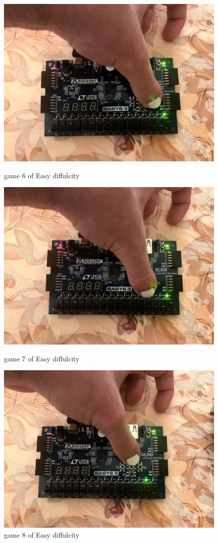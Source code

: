 \documentclass[11pt]{article}
\begin{document}
\begin{figure}[ht]
	\includegraphics{IMG_1316.JPG}
	\caption{game 6 of Easy diffulcity }
	\label{fig:sim_with_table}
	
	\includegraphics{IMG_1317.JPG}
	\caption{game 7 of Easy diffulcity }
	\label{fig:sim_with_table}
	
	\includegraphics{IMG_1318.JPG}
	\caption{game 8 of Easy diffulcity }
	\label{fig:sim_with_table}
	

\end{figure}
\end{document}
